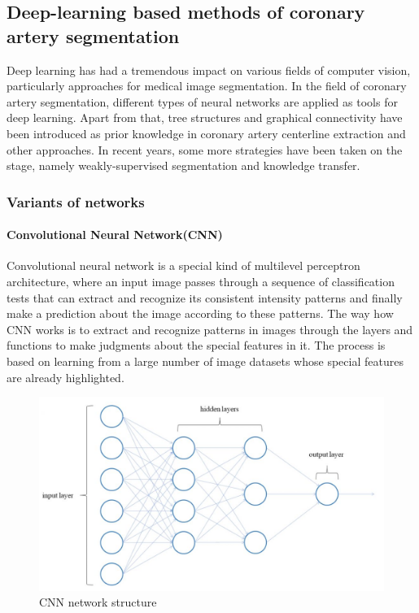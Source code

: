\documentclass[lang=cn,11pt,a4paper,cite=numbers]{elegantpaper}
\begin{document}
\subsection{Deep-learning based methods of coronary artery segmentation}

Deep learning has had a tremendous impact on various fields of computer vision, particularly approaches for medical image segmentation. In the field of coronary artery segmentation, different types of neural networks are applied as tools for deep learning. Apart from that, tree structures and graphical connectivity have been introduced as prior knowledge in coronary artery centerline extraction and other approaches. In recent years, some more strategies have been taken on the stage, namely weakly-supervised segmentation and knowledge transfer.

\subsubsection{Variants of networks}

\paragraph{Convolutional Neural Network(CNN)}

Convolutional neural network is a special kind of multilevel perceptron architecture, where an input image passes through a sequence of classification tests that can extract and recognize its consistent intensity patterns and finally make a prediction about the image according to these patterns. The way how CNN works is to extract and recognize patterns in images through the layers and functions to make judgments about the special features in it. The process is based on learning from a large number of image datasets whose special features are already highlighted. 

\begin{figure}[H]
    \centering
    \includegraphics[scale=0.5]{./image/文献综述/CNN.jpg}
    \caption{CNN network structure}
    \label{fig:CNN}
\end{figure}
\end{document}
